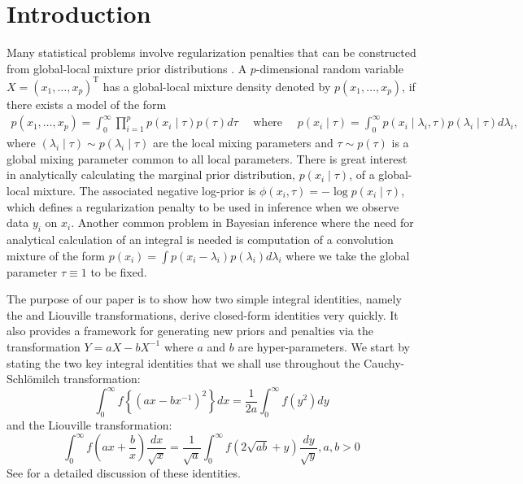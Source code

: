 \documentclass[lineno]{biometrika}
\def\T{{ \mathrm{\scriptscriptstyle T} }}
\begin{document}
\section{Introduction}
Many statistical problems involve regularization penalties that can be constructed from global-local mixture prior distributions \citep{polson2011data, hans2011comment,bhadra2015horseshoe+}. A $p$-dimensional random variable $X = (x_1, \ldots, x_p)^{\T}$ has a global-local mixture density denoted by $p(x_1, \ldots, x_p)$, if there exists a model of the form 
\begin{gather*}
p(x_1, \ldots, x_p) = \int_{0}^{\infty}\prod_{i=1}^{p}  p(x_i \mid \tau) p(\tau) d\tau \quad \text{ where } \quad
p( x_i \mid \tau) = \int_{0}^{\infty} p(x_i \mid \lambda_i, \tau) p(\lambda_i \mid \tau) d\lambda_i, 
\end{gather*}
where $(\lambda_i \mid \tau) \sim p(\lambda_i \mid \tau )$ are the local mixing parameters and $\tau \sim p(\tau)$ is a global mixing parameter common to all local parameters.
There is great interest in analytically calculating the marginal prior distribution, $p(x_i \mid \tau)$, of a global-local mixture. The associated negative log-prior is $\phi(x_i, \tau) = -\log p(x_i \mid \tau)$, which defines a regularization penalty to be used in inference when we observe data $y_i$ on $x_i$. Another common problem in Bayesian inference where the need for analytical calculation of an integral is needed is computation of a convolution mixture of the form $p(x_i) = \int p(x_i - \lambda_i) p(\lambda_i) d \lambda_i$ where we take the global parameter $\tau \equiv 1$ to be fixed. 

The purpose of our paper is to show how two simple integral identities, namely the \CS and Liouville transformations, derive closed-form identities very quickly. It also provides a framework for generating new priors and penalties via the transformation $Y = a X - b X^{-1}$ where $a$ and $b$ are hyper-parameters. 
We start by stating the two key integral identities that we shall use throughout the Cauchy-Schl\"omilch transformation: 
\begin{equation}
\int_0^\infty f \left\{ ( a x - b x^{-1} )^2 \right\} d x = \frac{1}{2a} \int_0^\infty f(y^2) d y \label{eq:identity}
\end{equation}
and the Liouville transformation:
\begin{equation}
\int_{0}^{\infty} f\left(ax + \frac{b}{x} \right) \frac{dx}{\sqrt{x}} = \frac{1}{\sqrt{a}} \int_{0}^{\infty} f \left( 2\sqrt{ab} + y \right) \frac{dy}{\sqrt{y}}, a,b >0 \label{eq:liouville}
\end{equation}
See \cite{boros2006irresistible,baker2008probabilistic,amdeberhan2010cauchy,jones2014generating} for a detailed discussion of these identities. 
\end{document}
